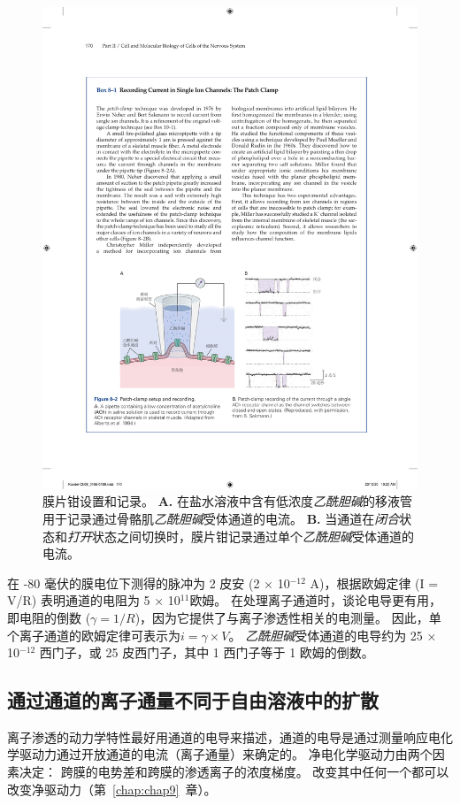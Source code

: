 \begin{figure}[htbp]
	\centering
	\includegraphics[width=0.8\linewidth]{chap08/fig_8_2}
	\caption{膜片钳设置和记录。
	\textbf{A.} 在盐水溶液中含有低浓度\textit{乙酰胆碱}的移液管用于记录通过骨骼肌\textit{乙酰胆碱}受体通道的电流\cite{alberts2017molecular}。
	\textbf{B.} 当通道在\textit{闭合}状态和\textit{打开}状态之间切换时，膜片钳记录通过单个\textit{乙酰胆碱}受体通道的电流。}
	\label{fig:8_2}
\end{figure}



在 -80 毫伏的膜电位下测得的脉冲为 2 皮安 (2 × 10$^{-12}$ A)，根据欧姆定律 (I = V/R) 表明通道的电阻为 5 × 10$^{11}$欧姆。
在处理离子通道时，谈论电导更有用，即电阻的倒数 ($\gamma = 1/R$)，因为它提供了与离子渗透性相关的电测量。
因此，单个离子通道的欧姆定律可表示为$i=\gamma \times V$。
\textit{乙酰胆碱}受体通道的电导约为 25 × 10$^{-12}$ 西门子，或 25 皮西门子，其中 1 西门子等于 1 欧姆的倒数。



\subsection{通过通道的离子通量不同于自由溶液中的扩散}

离子渗透的动力学特性最好用通道的电导来描述，通道的电导是通过测量响应电化学驱动力通过开放通道的电流（离子通量）来确定的。
净电化学驱动力由两个因素决定：
跨膜的电势差和跨膜的渗透离子的浓度梯度。
改变其中任何一个都可以改变净驱动力（第~\ref{chap:chap9}~章）。


